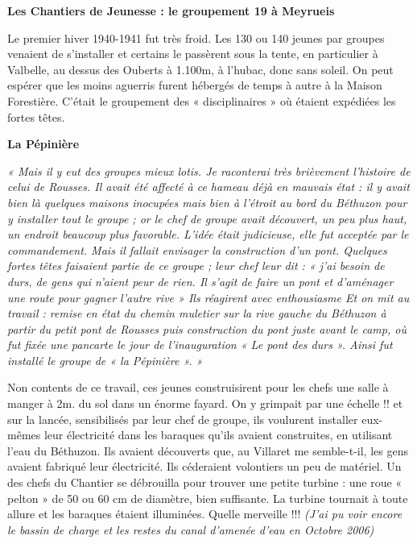 
\begin{center}
{\Large\bfseries Les Chantiers de Jeunesse : le groupement 19 à Meyrueis\par}
\end{center}

Le premier hiver 1940-1941 fut très froid. Les 130 ou 140 jeunes par groupes
venaient de s’installer et certains le passèrent sous la tente, en particulier à Valbelle,
au dessus des Ouberts à 1.100m, à l’hubac, donc sans soleil. On peut espérer que les
moins aguerris furent hébergés de temps à autre à la Maison Forestière. C’était le
groupement des « disciplinaires » où étaient expédiées les fortes têtes.

\textbf{La Pépinière}

\emph{« Mais il y eut des groupes mieux lotis. Je raconterai très brièvement l’histoire de
celui de Rousses. Il avait été affecté à ce hameau déjà en mauvais état : il y avait
bien là quelques maisons inocupées mais bien à l’étroit au bord du Béthuzon pour y
installer tout le groupe ; or le chef de groupe avait découvert, un peu plus haut, un
endroit beaucoup plus favorable. L’idée était judicieuse, elle fut acceptée par le
commandement. Mais il fallait envisager la construction d’un pont. Quelques fortes
têtes faisaient partie de ce groupe ; leur chef leur dit : « j’ai besoin de durs, de gens
qui n’aient peur de rien. Il s’agit de faire un pont et d’aménager une route pour
gagner l’autre rive » Ils réagirent avec enthousiasme Et on mit au travail :
remise en état du chemin muletier sur la rive gauche du Béthuzon à partir du petit
pont de Rousses puis construction du pont juste avant le camp, où fut fixée une
pancarte le jour de l’inauguration « Le pont des durs ». Ainsi fut installé le groupe
de « la Pépinière ». »}

Non contents de ce travail, ces jeunes construisirent pour les chefs une salle à
manger à 2m. du sol dans un énorme fayard. On y grimpait par une échelle !! et sur
la lancée, sensibilisés par leur chef de groupe, ils voulurent installer eux-mêmes leur
électricité dans les baraques qu’ils avaient construites, en utilisant l’eau du
Béthuzon. Ils avaient découverts que, au Villaret me semble-t-il, les gens avaient
fabriqué leur électricité. Ils céderaient volontiers un peu de matériel. Un des chefs
du Chantier se débrouilla pour trouver une petite turbine : une roue « pelton » de 50
ou 60 cm de diamètre, bien suffisante. La turbine tournait à toute allure et les
baraques étaient illuminées. Quelle merveille !!! \emph{(J’ai pu voir encore le bassin de
charge et les restes du canal d’amenée d’eau en Octobre 2006)}

